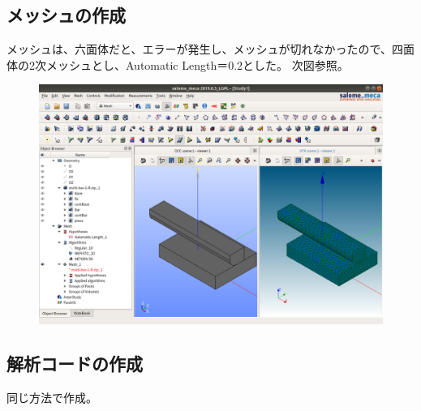 \documentclass[a4j,11pt,twoside,openany,dvipdfmx]{jsarticle}
\begin{document}
\subsection{メッシュの作成}
メッシュは、六面体だと、エラーが発生し、メッシュが切れなかったので、四面体の2次メッシュとし、Automatic Length＝0.2とした。
次図参照。
\begin{figure}[H]
	\centering
	\includegraphics[width=0.9\linewidth]{fig/fig005.png}
\end{figure}
\subsection{解析コードの作成}
同じ方法で作成。
\end{document}
